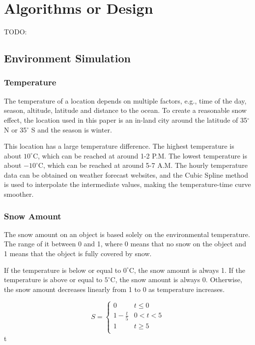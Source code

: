 \documentclass{article}
\begin{document}
\section {Algorithms or Design}
TODO:

\subsection {Environment Simulation}

\subsubsection {Temperature}
The temperature of a location depends on multiple factors, e.g., time of the day, season, altitude, 
latitude and distance to the ocean. To create a reasonable snow effect, the location used in this paper 
is an in-land city around the latitude of 35$^{\circ}$ N or 35$^{\circ}$ S and the season is winter.

This location has a large temperature difference. The highest temperature is about 
\(10^\circ\mathrm{C}\), which can be reached at around 1-2 P.M. The lowest temperature is about 
\(-10^\circ\mathrm{C}\), which can be reached at around 5-7 A.M. The hourly temperature data can be
obtained on weather forecast websites, and the Cubic Spline method is used to interpolate the 
intermediate values, making the temperature-time curve smoother.

\subsubsection {Snow Amount}
The snow amount on an object is based solely on the environmental temperature. 
The range of it between 0 and 1, where 0 means that no snow on the object and 1 means
that the object is fully covered by snow.

If the temperature is below or equal to \(0^\circ\mathrm{C}\), the snow amount is always 1. 
If the temperature is above or equal to \(5^\circ\mathrm{C}\), the snow amount is always 0. 
Otherwise, the snow amount decreases linearly from 1 to 0 as temperature increases.

\[
  S=
  \left\{
    \begin{array}{ll}
      0 & t\leq 0 \\
      1 - \frac{t}{5} &  0 < t < 5 \\
      1 & t\geq 5 \\
    \end{array} 
  \right. 
\]
 t 
\end{document}
